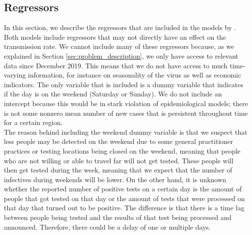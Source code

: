 \documentclass[12pt]{article}
\begin{document}
	\subsection{Regressors} \label{subsec:regressor_data}
	In this section, we describe the regressors that are included in the models by \textcite{adda2016economic}. Both models include regressors that may not directly have an effect on the transmission rate. We cannot include many of these regressors because, as we explained in Section \ref{sec:problem_description}, %
	we only have access to relevant data since December 2019. This means that we do not have access to %
    much time-varying information, for instance on seasonality of the virus as well as economic indicators. %
	The only variable that is included is a dummy variable that indicates if the day is on the weekend (Saturday or Sunday). We do not include an intercept because this would be in stark violation of epidemiological models; there is not some nonzero mean number of new cases that is persistent throughout time for a certain region. \\
	
	The reason behind including the weekend dummy variable is that we suspect that less people may be detected on the weekend due to some general practitioner practices or testing locations being closed on the weekend, meaning that people who are not willing or able to travel far will not get tested. These people will then get tested during the week, meaning that we expect that the number of infectives during weekends will be lower. On the other hand, it is unknown whether the reported number of positive tests on a certain day is the amount of people that got tested on that day or the amount of tests that were processed on that day that turned out to be positive. The difference is that there is a time lag between people being tested and the results of that test being processed and announced. Therefore, there could be a delay of one or multiple days.
	
	
\end{document}
